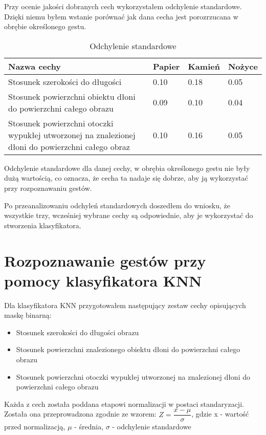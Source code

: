 \documentclass[a4paper,12pt,twoside,openany]{report}
\begin{document}
Przy ocenie jakości dobranych cech wykorzystałem odchylenie standardowe. Dzięki niemu byłem wstanie porównać jak dana cecha jest porozrzucana w obrębie określonego gestu.

\begin{table}[H]
	\centering
	\begin{tabularx}{\textwidth}{|X|l|l|l|}
		\hline
		\textbf{Nazwa cechy} & \textbf{Papier} & \textbf{Kamień} & \textbf{Nożyce} \\ 
		
		\hline
		Stosunek szerokości do długości & 0.10 & 0.18 & 0.05 \\ 
		
		\hline
		Stosunek powierzchni obiektu dłoni do powierzchni całego obrazu & 0.09 & 0.10 & 0.04 \\ 
		
		\hline
		Stosunek powierzchni otoczki wypukłej utworzonej na znalezionej dłoni do powierzchni całego obraz & 0.10 & 0.16 & 0.05 \\ 
		\hline
	\end{tabularx}
	
	\caption{Odchylenie standardowe}
\end{table}
Odchylenie standardowe dla danej cechy, w obrębia określonego gestu nie były dużą wartością, co oznacza, że cecha ta nadaje się dobrze, aby ją wykorzystać przy rozpoznawaniu gestów.

Po przeanalizowaniu odchyleń standardowych doszedłem do wniosku, że wszystkie trzy, wcześniej wybrane cechy są odpowiednie, aby je wykorzystać do stworzenia klasyfikatora.  

\section{Rozpoznawanie gestów przy pomocy klasyfikatora KNN}
Dla klasyfikatora KNN przygotowałem następujący zestaw cechy opisujących maskę binarną: 
\begin{itemize}
	\item Stosunek szerokości do długości obrazu
	\item Stosunek powierzchni znalezionego obiektu dłoni do powierzchni całego obrazu
	\item Stosunek powierzchni otoczki wypukłej utworzonej na znalezionej dłoni do powierzchni całego obrazu
\end{itemize}

Każda z cech została poddana etapowi normalizacji w postaci standaryzacji. Została ona przeprowadzona zgodnie ze wzorem: $ Z = \dfrac{x - \mu}{\sigma} $, gdzie x - wartość przed normalizacją, $\mu$ - średnia, $\sigma$ - odchylenie standardowe
\end{document}
